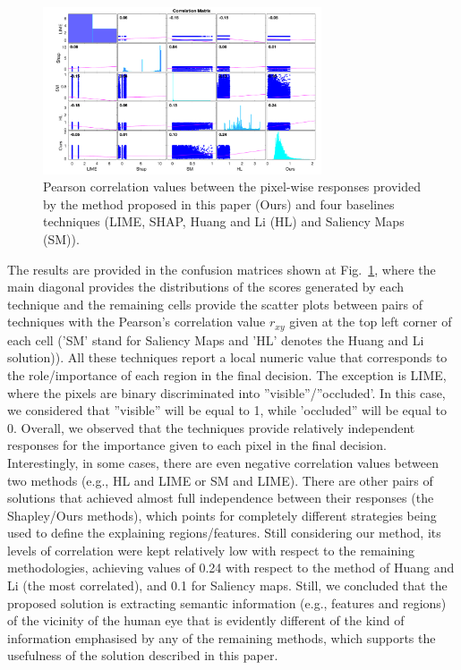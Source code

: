 \documentclass[final]{cvpr}
\begin{document}
 \begin{figure}
  \begin{center}
  \includegraphics[width=233pt]{figures/correlation.pdf}
  \caption{Pearson correlation values between the pixel-wise responses provided by the method proposed in this paper (Ours) and four baselines techniques (LIME, SHAP, Huang and Li (HL) and  Saliency Maps (SM)).}
  \label{fig:correlation}
  \end{center}
\end{figure}

The results are provided in the confusion matrices shown at Fig.~\ref{fig:correlation}, where the main diagonal provides the distributions of the scores generated by each technique and the remaining cells provide the scatter plots between pairs of techniques with the Pearson's correlation value $r_{xy}$ given at the top left corner of each cell ('SM' stand for Saliency Maps and 'HL' denotes the Huang and Li solution)). All these techniques report a local numeric value that corresponds to the role/importance of each region in the final decision. The exception is LIME, where the pixels are binary discriminated into ''visible''/''occluded'. In this case, we considered that ''visible'' will be equal to 1, while 'occluded'' will be equal to 0. Overall, we observed that the techniques provide relatively independent responses for the importance given to each pixel in the final decision. Interestingly, in some cases, there are even negative correlation values between two methods (e.g., HL and LIME or SM and LIME). There are other pairs of solutions that achieved almost full independence between their responses (the Shapley/Ours methods), which points for completely different strategies being used to define the explaining regions/features. Still considering our method, its levels of correlation were kept relatively low with respect to the remaining methodologies, achieving values of  0.24 with respect to the method of Huang and Li (the most correlated), and 0.1 for Saliency maps. Still, we concluded that the proposed solution is extracting  semantic information (e.g., features and regions) of the vicinity of the human eye that is evidently different of the kind of information emphasised  by any of the remaining methods, which supports the usefulness of the solution described in this paper.
\end{document}
